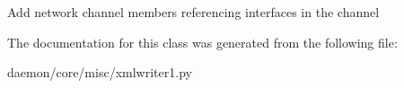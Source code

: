 \begin{DoxyVerb}Add network channel members referencing interfaces in the channel
\end{DoxyVerb}
 

The documentation for this class was generated from the following file\+:\begin{DoxyCompactItemize}
\item 
daemon/core/misc/xmlwriter1.\+py\end{DoxyCompactItemize}
